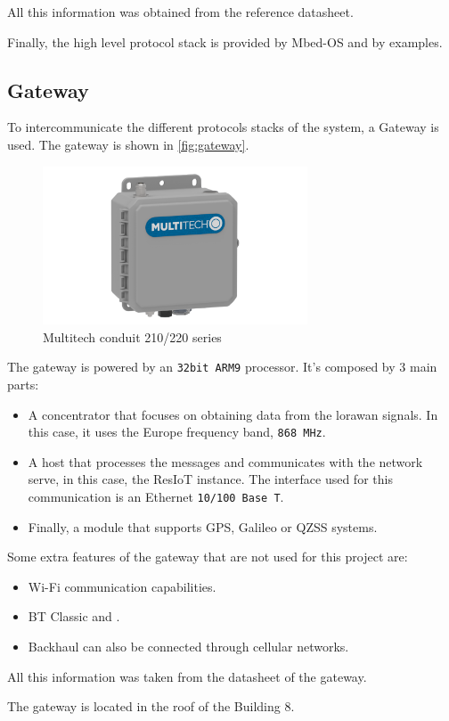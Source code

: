 All this information was obtained from the reference datasheet.

Finally, the high level protocol stack is provided by Mbed-OS and by examples.
\clearpage
\subsection{Gateway}

To intercommunicate the different protocols stacks of the system, a Gateway is used. The gateway is shown in \autoref{fig:gateway}.

\begin{figure}[H]
    \centering
    \includegraphics[width=0.7\textwidth]{images/3/multitechip67200.png}
    \caption{Multitech conduit 210/220 series}
    \label{fig:gateway}
\end{figure}

The gateway is powered by an \texttt{32bit ARM9} processor. It's composed by 3 main parts:
\begin{itemize}
    \item A concentrator that focuses on obtaining data from the \acrshort{lorawan} signals. In this case, it uses the Europe frequency band, \texttt{868 MHz}.
    \item A host that processes the  messages and communicates with the network serve, in this case, the ResIoT instance. The interface used for this communication is an Ethernet \texttt{10/100 Base T}.
    \item Finally, a  module that supports GPS, Galileo or QZSS systems.
\end{itemize}

Some extra features of the gateway that are not used for this project are:
\begin{itemize}
    \item Wi-Fi communication capabilities.
    \item BT Classic and .
    \item Backhaul can also be connected through cellular networks.
\end{itemize} 

All this information was taken from the datasheet of the gateway\cite{MultiTechConduitIP67}.

The gateway is located in the roof of the Building 8.

